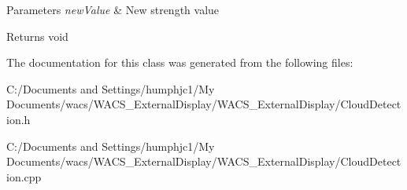 \begin{DoxyParams}{Parameters}
{\em newValue} & New strength value \\
\hline
\end{DoxyParams}
\begin{DoxyReturn}{Returns}
void 
\end{DoxyReturn}


The documentation for this class was generated from the following files:\begin{DoxyCompactItemize}
\item 
C:/Documents and Settings/humphjc1/My Documents/wacs/WACS\_\-ExternalDisplay/WACS\_\-ExternalDisplay/CloudDetection.h\item 
C:/Documents and Settings/humphjc1/My Documents/wacs/WACS\_\-ExternalDisplay/WACS\_\-ExternalDisplay/CloudDetection.cpp\end{DoxyCompactItemize}
